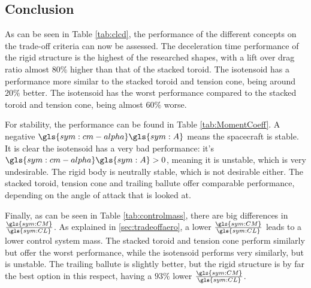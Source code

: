 \subsection{Conclusion}
As can be seen in Table \ref{tab:clcd}, the performance of the different concepts on the trade-off criteria can now be assessed. The deceleration time performance of the rigid structure is the highest of the researched shapes, with a lift over drag ratio almost $80\%$ higher than that of the stacked toroid. The isotensoid has a performance more similar to the stacked toroid and tension cone, being around $20\%$ better. The isotensoid has the worst performance compared to the stacked toroid and tension cone, being almost $60\%$ worse.

For stability, the performance can be found in Table \ref{tab:MomentCoeff}. A negative $\gls{sym:cm-alpha}\gls{sym:A}$ means the spacecraft is stable. It is clear the isotensoid has a very bad performance: it's $\gls{sym:cm-alpha}\gls{sym:A}>0$, meaning it is unstable, which is very undesirable. The rigid body is neutrally stable, which is not desirable either. The stacked toroid, tension cone and trailing ballute offer comparable performance, depending on the angle of attack that is looked at.

Finally, as can be seen in Table \ref{tab:controlmass}, there are big differences in $\frac{\gls{sym:CM}}{\gls{sym:CL}}$. As explained in \ref{sec:tradeoffaero}, a lower $\frac{\gls{sym:CM}}{\gls{sym:CL}}$ leads to a lower control system mass. The stacked toroid and tension cone perform similarly but offer the worst performance, while the isotensoid performs very similarly, but is unstable. The trailing ballute is slightly better, but the rigid structure is by far the best option in this respect, having a $93\%$ lower $\frac{\gls{sym:CM}}{\gls{sym:CL}}$.

